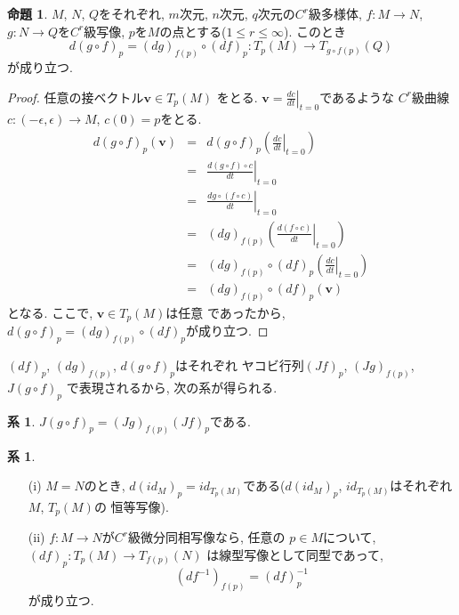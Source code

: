 \documentclass[a4j,12pt]{jarticle}
\theoremstyle{definition}
\newtheorem{proposition}[theorem]{命題}
\newtheorem{corollary}[theorem]{系}
\begin{document}
\begin{proposition}
    $M$, $N$, $Q$をそれぞれ, $m$次元, $n$次元, 
    $q$次元の$C^r$級多様体, 
    $f:M\to N$, $g:N\to Q$を$C^r$級写像, 
    $p$を$M$の点とする($1\leq r\leq \infty$). 
    このとき
    $$d(g\circ f)_p=(dg)_{f(p)}\circ (df)_p:
    T_p(M)\to T_{g\circ f(p)}(Q)$$
    が成り立つ. 
\end{proposition}
\begin{proof}
    任意の接ベクトル$\boldsymbol{v}\in T_p(M)$
    をとる. $\boldsymbol{v}=
    \left .\frac{dc}{dt}\right|_{t=0}$であるような
    $C^r$級曲線$c:(-\epsilon, \epsilon)\to M$, 
    $c(0)=p$をとる. 
    \begin{eqnarray*}
        d(g\circ f)_p(\boldsymbol{v})&=&
        d(g\circ f)_p\left(\left .
        \frac{dc}{dt}\right|_{t=0}\right)\\
        &=&\left .
        \frac{d(g\circ f)\circ c}{dt}
        \right|_{t=0}\\
        &=&\left .
        \frac{dg\circ (f\circ c)}{dt}
        \right|_{t=0}\\
        &=&(dg)_{f(p)}
        \left(\left .
        \frac{d(f\circ c)}{dt}\right|_{t=0}\right)\\
        &=&(dg)_{f(p)}\circ (df)_p
        \left(\left .
        \frac{dc}{dt}\right|_{t=0}\right)\\
        &=&(dg)_{f(p)}\circ (df)_p
        (\boldsymbol{v})
    \end{eqnarray*}
    となる. ここで, $\boldsymbol{v}\in T_p(M)$は任意
    であったから, $d(g\circ f)_p=
    (dg)_{f(p)}\circ(df)_p$が成り立つ. 
\end{proof}
$(df)_p$, $(dg)_{f(p)}$, $d(g\circ f)_p$はそれぞれ
ヤコビ行列$(Jf)_p$, $(Jg)_{f(p)}$, $J(g\circ f)_p$
で表現されるから, 次の系が得られる. 
\begin{corollary}
    $J(g\circ f)_p=(Jg)_{f(p)}(Jf)_p$である. 
\end{corollary}
\begin{corollary}
    \begin{itemize}
        \item[(i)]$M=N$のとき, $d(id_M)_p
        =id_{T_p(M)}$である($d(id_M)_p$, 
        $id_{T_p(M)}$はそれぞれ$M$, $T_p(M)$の
        恒等写像). 
        \item[(ii)]
        $f:M\to N$が$C^r$級微分同相写像なら, 任意の
        $p\in M$について, $(df)_p:T_p(M)\to T_{f(p)}(N)$
        は線型写像として同型であって, 
        $$(df^{-1})_{f(p)}=(df)_p^{-1}$$
        が成り立つ. 
    \end{itemize}
\end{corollary}
\end{document}
